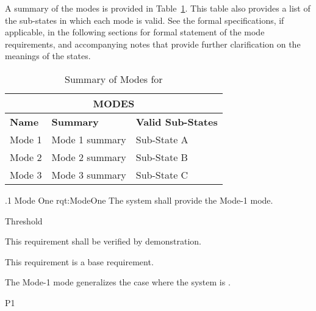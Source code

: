 
A summary of the modes is provided in Table~\ref{tab:Modes}.
This table also provides a list of the sub-states in which each mode is valid.
See the formal specifications, if applicable, in the following sections for formal statement of the mode requirements, and accompanying notes that provide further clarification on the meanings of the states.
\begin{table}[htbp]
	\begin{center}
		\begin{tabular}{|p{1.0in}|p{4.0in}|p{1.0in}|}
			\hline
			\hline
			     \multicolumn{3}{|c|}{{\bf MODES}}\\
			\hline
{\bf Name} & {\bf Summary}	& {\bf Valid Sub-States}\\
			\hline
			\hline
Mode 1 & Mode 1 summary & Sub-State A\\ \hline
Mode 2 & Mode 2 summary & Sub-State B\\ \hline
Mode 3 & Mode 3 summary & Sub-State C\\ 
			\hline
			\hline
			\end{tabular}
				\caption{Summary of Modes for \ThisSystem}
				\label{tab:Modes}
		\end{center}
\end{table}


\ONERQMTV
{\RqtNumberBase.1}
{Mode One}
{rqt:ModeOne}
{The system shall provide the Mode-1 mode.}
{
	\item [Phase 1] Threshold
}
{This requirement shall be verified by demonstration.}
{
	\item [N/A] This requirement is a base requirement.
}
{
	\item The Mode-1 mode generalizes the case where the system is \TBD.
}
{P1}


